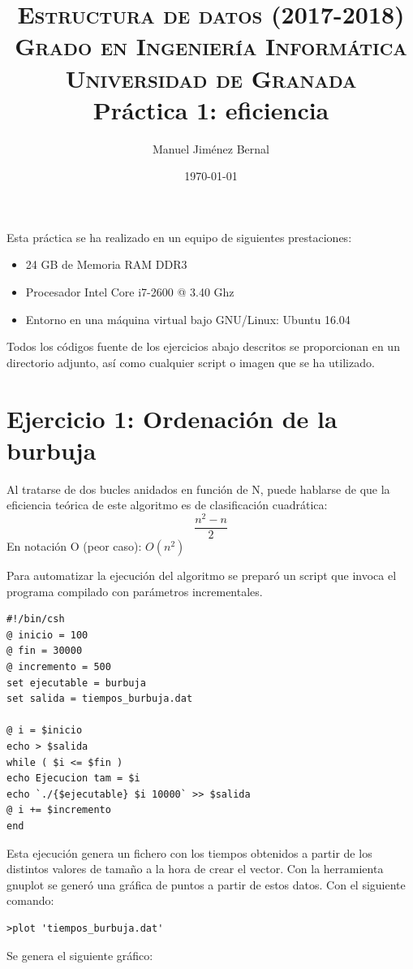 \documentclass[paper=a4, fontsize=10pt]{scrartcl} %
\title{	
\normalfont \normalsize 
\textsc{{ Estructura de datos (2017-2018)} \\ Grado en Ingeniería Informática \\ Universidad de Granada} \\ [25pt] %
\huge Práctica 1: eficiencia  \\ %
}
\author{Manuel Jiménez Bernal}
\date{\normalsize\today} %
\begin{document}
\maketitle %

Esta práctica se ha realizado en un equipo de siguientes prestaciones:
\begin{itemize}  
	\item 24 GB de Memoria RAM DDR3 
	\item Procesador Intel Core i7-2600 @ 3.40 Ghz
	\item Entorno en una máquina virtual bajo GNU/Linux: Ubuntu 16.04
\end{itemize}

Todos los códigos fuente de los ejercicios abajo descritos se proporcionan en un directorio adjunto, así como cualquier script o imagen que se ha utilizado.

\section{Ejercicio 1: Ordenación de la burbuja}

Al tratarse de dos bucles anidados en función de N, puede hablarse de que la eficiencia teórica de este algoritmo es de clasificación cuadrática: \[ \dfrac{ n^2 - n}{2} \]
En notación O (peor caso): $O(n^2)$ %

Para automatizar la ejecución del algoritmo se preparó un script que invoca el programa compilado con parámetros incrementales.

\begin{lstlisting}
#!/bin/csh
@ inicio = 100
@ fin = 30000
@ incremento = 500
set ejecutable = burbuja
set salida = tiempos_burbuja.dat

@ i = $inicio
echo > $salida
while ( $i <= $fin )
echo Ejecucion tam = $i
echo `./{$ejecutable} $i 10000` >> $salida
@ i += $incremento
end
\end{lstlisting}

Esta ejecución genera un fichero con los tiempos obtenidos a partir de los distintos valores de tamaño a la hora de crear el vector. Con la herramienta gnuplot se generó una gráfica de puntos a partir de estos datos. Con el siguiente comando:

\begin{lstlisting}
>plot 'tiempos_burbuja.dat'
\end{lstlisting}

Se genera el siguiente gráfico:
\end{document}
